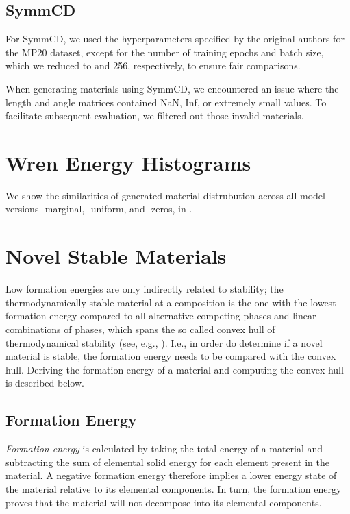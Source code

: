 \subsection{SymmCD}
For SymmCD, we used the hyperparameters specified by the original authors for the MP20 dataset, except for the number of training epochs and batch size, which we reduced to  and 256, respectively, to ensure fair comparisons.

When generating materials using SymmCD, we encountered an issue where the length and angle matrices contained NaN, Inf, or extremely small values. To facilitate subsequent evaluation, we filtered out those invalid materials.


\section{Wren Energy Histograms}
\label{app:wren_energies}

We show the similarities of generated material distrubution across all model versions \ourmodel-marginal, \ourmodel-uniform, and \ourmodel-zeros, in .



\section{Novel Stable Materials}
\label{app:novel_stable_materials}


Low formation energies are only indirectly related to stability; the thermodynamically stable material at a composition is the one with the lowest formation energy compared to all alternative competing phases and linear combinations of phases, which spans the so called convex hull of thermodynamical stability 
(see, e.g., \citep{bartel_critical_2020}). I.e., in order do determine if a novel material is stable, the formation energy needs to be compared with the convex hull. Deriving the formation energy of a material and computing the convex hull is described below.

\subsection{Formation Energy}
\label{app:form_energy}
\textit{Formation energy} is calculated by taking the total energy of a material and subtracting the sum of elemental solid energy for each element present in the material. A negative formation energy therefore implies a lower energy state of the material relative to its elemental components. In turn, the formation energy proves that the material will not decompose into its elemental components.

